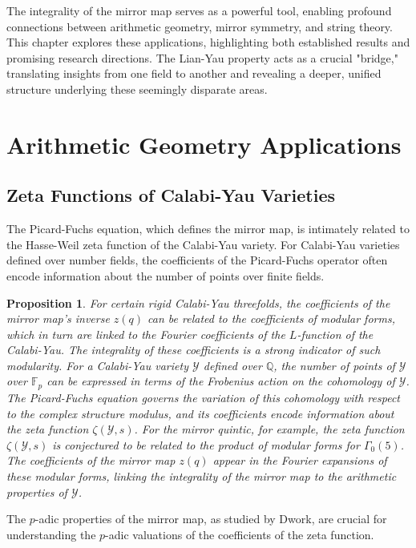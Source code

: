 \documentclass{book}
\newcommand{\calY}{\mathcal{Y}} %
\newcommand{\qexp}{q} %
\newcommand{\zmod}{z} %
\newcommand{\Zeta}{\zeta} %
\newtheorem{proposition}[theorem]{Proposition}
\theoremstyle{definition}
\begin{document}
The integrality of the mirror map serves as a powerful tool, enabling profound connections between arithmetic geometry, mirror symmetry, and string theory. This chapter explores these applications, highlighting both established results and promising research directions. The Lian-Yau property acts as a crucial "bridge," translating insights from one field to another and revealing a deeper, unified structure underlying these seemingly disparate areas.

\section{Arithmetic Geometry Applications}

\subsection{Zeta Functions of Calabi-Yau Varieties}
The Picard-Fuchs equation, which defines the mirror map, is intimately related to the Hasse-Weil zeta function of the Calabi-Yau variety. For Calabi-Yau varieties defined over number fields, the coefficients of the Picard-Fuchs operator often encode information about the number of points over finite fields.
\begin{proposition}
For certain rigid Calabi-Yau threefolds, the coefficients of the mirror map's inverse $\zmod(\qexp)$ can be related to the coefficients of modular forms, which in turn are linked to the Fourier coefficients of the $L$-function of the Calabi-Yau. The integrality of these coefficients is a strong indicator of such modularity. For a Calabi-Yau variety $\calY$ defined over $\mathbb{Q}$, the number of points of $\calY$ over $\mathbb{F}_p$ can be expressed in terms of the Frobenius action on the cohomology of $\calY$. The Picard-Fuchs equation governs the variation of this cohomology with respect to the complex structure modulus, and its coefficients encode information about the zeta function $\Zeta(\calY, s)$. For the mirror quintic, for example, the zeta function $\Zeta(\calY, s)$ is conjectured to be related to the product of modular forms for $\Gamma_0(5)$. The coefficients of the mirror map $\zmod(\qexp)$ appear in the Fourier expansions of these modular forms, linking the integrality of the mirror map to the arithmetic properties of $\calY$.
\end{proposition}
The $p$-adic properties of the mirror map, as studied by Dwork, are crucial for understanding the $p$-adic valuations of the coefficients of the zeta function.
\end{document}
